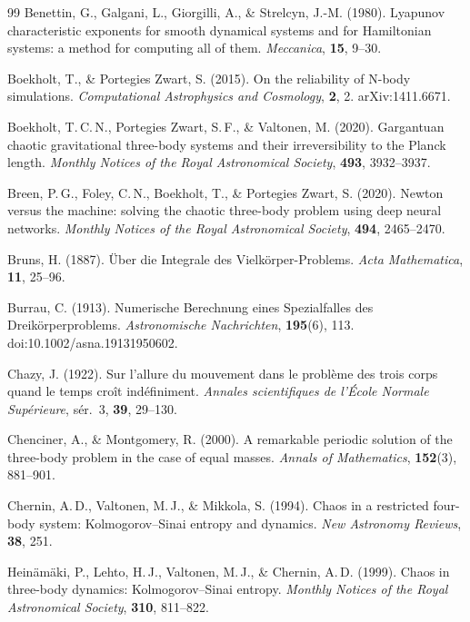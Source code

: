 \documentclass[11pt,a4paper]{article}
\begin{document}
\begin{thebibliography}{99}
Benettin, G., Galgani, L., Giorgilli, A., \& Strelcyn, J.-M. (1980).
Lyapunov characteristic exponents for smooth dynamical systems and for Hamiltonian systems:
a method for computing all of them.
\textit{Meccanica}, \textbf{15}, 9--30.

Boekholt, T., \& Portegies Zwart, S. (2015).
On the reliability of N-body simulations.
\textit{Computational Astrophysics and Cosmology}, \textbf{2}, 2.
arXiv:1411.6671.

Boekholt, T.\,C.\,N., Portegies Zwart, S.\,F., \& Valtonen, M. (2020).
Gargantuan chaotic gravitational three-body systems and their irreversibility to the Planck length.
\textit{Monthly Notices of the Royal Astronomical Society}, \textbf{493}, 3932--3937.

Breen, P.\,G., Foley, C.\,N., Boekholt, T., \& Portegies Zwart, S. (2020).
Newton versus the machine: solving the chaotic three-body problem using deep neural networks.
\textit{Monthly Notices of the Royal Astronomical Society}, \textbf{494}, 2465--2470.

Bruns, H. (1887).
\"{U}ber die Integrale des Vielk\"{o}rper-Problems.
\textit{Acta Mathematica}, \textbf{11}, 25--96.

Burrau, C. (1913).
Numerische Berechnung eines Spezialfalles des Dreik\"{o}rperproblems.
\textit{Astronomische Nachrichten}, \textbf{195}(6), 113.
doi:10.1002/asna.19131950602.

Chazy, J. (1922).
Sur l'allure du mouvement dans le probl\`{e}me des trois corps quand le temps cro\^{i}t ind\'{e}finiment.
\textit{Annales scientifiques de l'\'{E}cole Normale Sup\'{e}rieure}, s\'{e}r.\ 3, \textbf{39}, 29--130.

Chenciner, A., \& Montgomery, R. (2000).
A remarkable periodic solution of the three-body problem in the case of equal masses.
\textit{Annals of Mathematics}, \textbf{152}(3), 881--901.

Chernin, A.\,D., Valtonen, M.\,J., \& Mikkola, S. (1994).
Chaos in a restricted four-body system: Kolmogorov--Sinai entropy and dynamics.
\textit{New Astronomy Reviews}, \textbf{38}, 251.

Heinäm\"{a}ki, P., Lehto, H.\,J., Valtonen, M.\,J., \& Chernin, A.\,D. (1999).
Chaos in three-body dynamics: Kolmogorov--Sinai entropy.
\textit{Monthly Notices of the Royal Astronomical Society}, \textbf{310}, 811--822.


\end{thebibliography}
\end{document}
